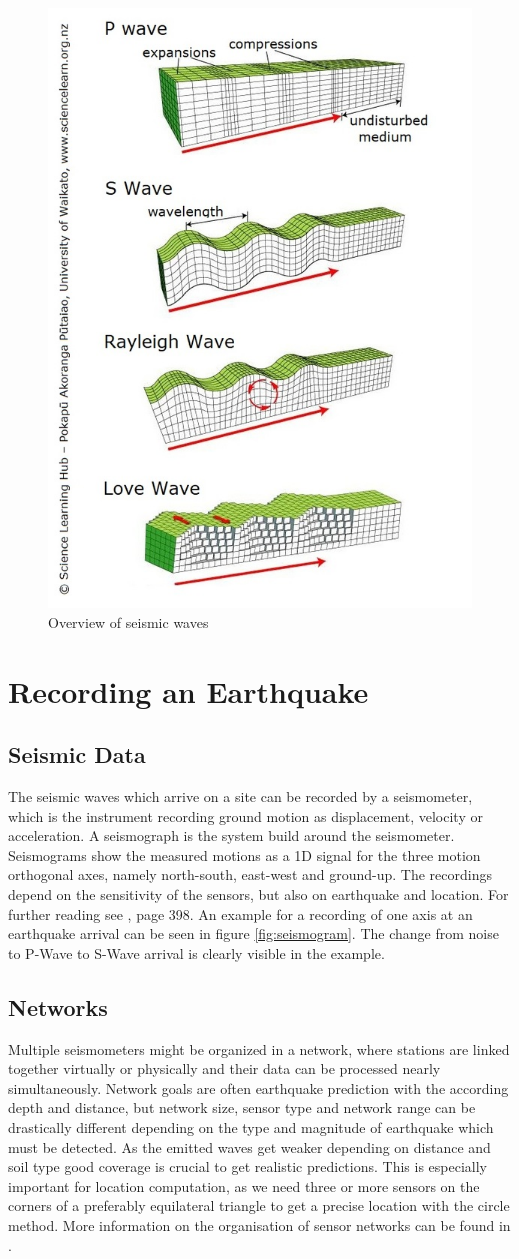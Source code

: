\documentclass[thesis.tex]{subfiles}
\begin{document}
\begin{figure}[hb]
	\centering
	\includegraphics[width=0.6\linewidth]{../pictures/Prerequisites/waves.jpg}
	\caption{Overview of seismic waves}
	\label{fig:waves}
\end{figure}
\section{Recording an Earthquake}
\subsection{Seismic Data}
The seismic waves which arrive on a site can be recorded by a seismometer, which is the instrument recording ground motion as displacement, velocity or acceleration. A seismograph is the system build around the seismometer. Seismograms show the measured motions as a 1D signal for the three motion orthogonal axes, namely north-south, east-west and ground-up. The recordings depend on the sensitivity of the sensors, but also on earthquake and location. For further reading see \citet{IntroEarthquakes}, page 398. An example for a recording of one axis at an earthquake arrival can be seen in figure \ref{fig:seismogram}. The change from noise to P-Wave to S-Wave arrival is clearly visible in the example. 
\subsection{Networks}
Multiple seismometers might be organized in a network, where stations are linked together virtually or physically and their data can be processed nearly simultaneously. Network goals are often earthquake prediction with the according depth and distance, but network size, sensor type and network range can be drastically different depending on the type and magnitude of earthquake which must be detected. As the emitted waves get weaker depending on distance and soil type good coverage is crucial to get realistic predictions. This is especially important for location computation, as we need three or more sensors on the corners of a preferably equilateral triangle to get a precise location with the circle method. More information on the organisation of sensor networks can be found in \cite{Havskov2016}.
\end{document}

